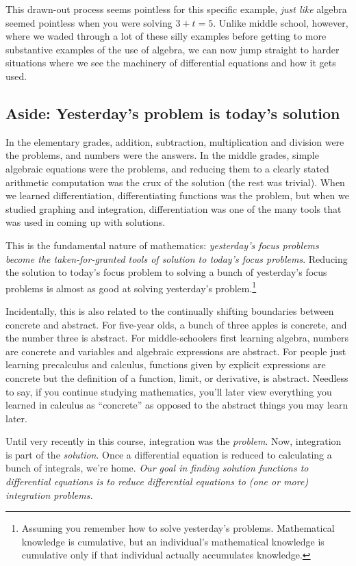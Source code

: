 \documentclass{amsart}
\begin{document}
This drawn-out process seems pointless for this specific example, {\em
just like} algebra seemed pointless when you were solving $3 + t =
5$. Unlike middle school, however, where we waded through a lot of
these silly examples before getting to more substantive examples of
the use of algebra, we can now jump straight to harder situations
where we see the machinery of differential equations and how it gets
used.

\subsection*{Aside: Yesterday's problem is today's solution}

In the elementary grades, addition, subtraction, multiplication and
division were the problems, and numbers were the answers. In the
middle grades, simple algebraic equations were the problems, and
reducing them to a clearly stated arithmetic computation was the crux of
the solution (the rest was trivial). When we learned differentiation,
differentiating functions was the problem, but when we studied
graphing and integration, differentiation was one of the many tools
that was used in coming up with solutions.

This is the fundamental nature of mathematics: {\em yesterday's focus
problems become the taken-for-granted tools of solution to today's
focus problems}. Reducing the solution to today's focus problem to
solving a bunch of yesterday's focus problems is almost as good at
solving yesterday's problem.\footnote{Assuming you remember how to
solve yesterday's problems. Mathematical knowledge is cumulative, but
an individual's mathematical knowledge is cumulative only if that
individual actually accumulates knowledge.}

Incidentally, this is also related to the continually shifting
boundaries between concrete and abstract. For five-year olds, a bunch
of three apples is concrete, and the number three is abstract. For
middle-schoolers first learning algebra, numbers are concrete and
variables and algebraic expressions are abstract. For people just
learning precalculus and calculus, functions given by explicit
expressions are concrete but the definition of a function, limit, or
derivative, is abstract. Needless to say, if you continue studying
mathematics, you'll later view everything you learned in calculus as
``concrete'' as opposed to the abstract things you may learn later.

Until very recently in this course, integration was the {\em
problem}. Now, integration is part of the {\em solution}. Once a
differential equation is reduced to calculating a bunch of integrals,
we're home. {\em Our goal in finding solution functions to
differential equations is to reduce differential equations to (one or
more) integration problems.}
\end{document}
